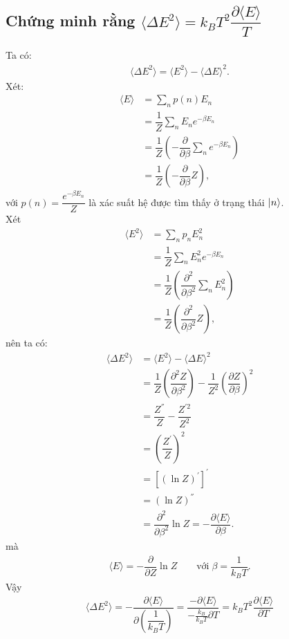 \documentclass{report}
\newcommand{\f}[2]{\dfrac{#1}{#2}}
\begin{document}
\subsection*{Chứng minh rằng $\langle \Delta E^2 \rangle = k_B T^2 \f{\partial \langle E \rangle}{T}$}
Ta có:
\begin{align*}
	\langle \Delta E^2 \rangle = \langle E^2 \rangle - \langle \Delta E \rangle^2.
\end{align*}
Xét:
\begin{align*}
	\langle E \rangle 
	&= \sum_{n} p(n) E_{n} \\
	&= \f{1}{Z} \sum_{n} E_{n} e^{-\beta E_{n}} \\
	&= \f{1}{Z} \left( -\f{\partial}{\partial \beta} \sum_{n}e^{-\beta E_{n}} 
	\right)\\
	&= \f{1}{Z} \left( -\f{\partial}{\partial \beta} Z \right),
\end{align*}
với $p(n) = \f{e^{-\beta E_{n}}}{Z}$ là xác suất hệ được tìm thấy ở trạng thái $\ket{n}$. \\
Xét
\begin{align*}
	\langle E^2 \rangle
	&= \sum_{n} p_{n} E_{n}^{2} \\
	&= \f{1}{Z} \sum_{n} E_{n}^{2} e^{-\beta E_{n}} \\
	&= \f{1}{Z} \left( \f{\partial^2}{\partial \beta^2} \sum_{n} E_{n}^{2} \right) \\
	&= \f{1}{Z} \left( \f{\partial^2}{\partial \beta^2} Z\right),
\end{align*}
nên ta có:
\begin{align*}
	\langle \Delta E^2 \rangle 
	&= \langle E^2 \rangle - \langle \Delta E \rangle^2 \\
	&= \f{1}{Z} \left( \f{\partial^2 Z}{\partial \beta^2} \right) - \f{1}{Z^2} \left( \f{\partial Z}{\partial \beta} \right)^2 \\
	&= \f{Z^{''}}{Z} - \f{Z^{'2}}{Z^2} \\
	&= \left(\f{Z^{'}}{Z}\right)^2 \\
	&= \left[ (\ln Z)^{'} \right]^{'} \\
	&= \left( \ln Z \right)^{''} \\
	&= \f{\partial^2}{\partial \beta^2} \ln Z = -\f{\partial \langle E \rangle}{\partial \beta}.
\end{align*}
mà
\begin{align*}
	\langle E \rangle = -\f{\partial}{\partial Z} \ln Z \quad \quad \text{với}\; \beta = \f{1}{k_{B}T}.
\end{align*}
Vậy
\begin{align*}
	\langle \Delta E^2 \rangle = -\f{\partial \langle E \rangle}{\partial \left( \f{1}{k_{B}T}\right)} = \f{-\partial \langle E \rangle}{-\frac{k_{B}}{k_{B}T}\partial T} = k_{B} T^2 \f{\partial \langle E \rangle}{\partial T}
\end{align*}
\end{document}
